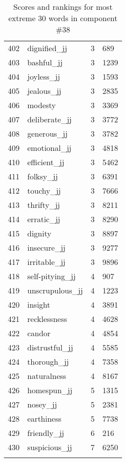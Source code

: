 \begin{longtable}[!htbp]{| rlr@{.}l |}
    402 & dignified\_jj & 3 & 689 \\
    403 & bashful\_jj & 3 & 1239 \\
    404 & joyless\_jj & 3 & 1593 \\
    405 & jealous\_jj & 3 & 2835 \\
    406 & modesty & 3 & 3369 \\
    407 & deliberate\_jj & 3 & 3772 \\
    408 & generous\_jj & 3 & 3782 \\
    409 & emotional\_jj & 3 & 4818 \\
    410 & efficient\_jj & 3 & 5462 \\
    411 & folksy\_jj & 3 & 6391 \\
    412 & touchy\_jj & 3 & 7666 \\
    413 & thrifty\_jj & 3 & 8211 \\
    414 & erratic\_jj & 3 & 8290 \\
    415 & dignity & 3 & 8897 \\
    416 & insecure\_jj & 3 & 9277 \\
    417 & irritable\_jj & 3 & 9896 \\
    418 & self-pitying\_jj & 4 & 907 \\
    419 & unscrupulous\_jj & 4 & 1223 \\
    420 & insight & 4 & 3891 \\
    421 & recklessness & 4 & 4628 \\
    422 & candor & 4 & 4854 \\
    423 & distrustful\_jj & 4 & 5585 \\
    424 & thorough\_jj & 4 & 7358 \\
    425 & naturalness & 4 & 8167 \\
    426 & homespun\_jj & 5 & 1315 \\
    427 & nosey\_jj & 5 & 2381 \\
    428 & earthiness & 5 & 7738 \\
    429 & friendly\_jj & 6 & 216 \\
    430 & suspicious\_jj & 7 & 6250 \\
    \hline
    \caption{Scores and rankings for most extreme 30 words in component \#38} \\
\end{longtable}
